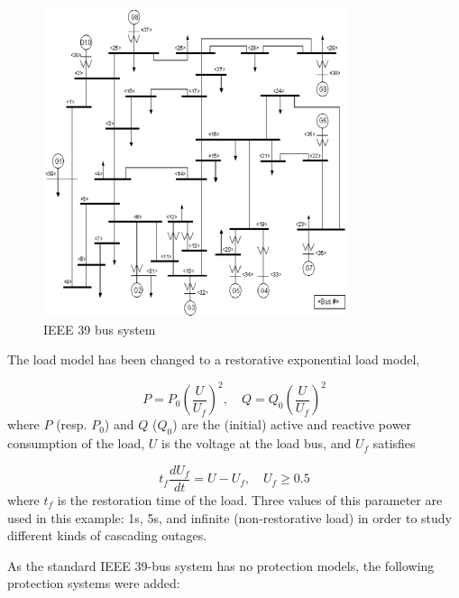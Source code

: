 \begin{figure}
    \centering
    \includegraphics[width=0.8\textwidth]{Figs/IEEE39.png}
    \caption{IEEE 39 bus system~\cite{IEEE39figure}}
    \label{fig:IEEE39}
\end{figure}

The load model has been changed to a restorative exponential load model, \ie

\begin{equation}
\label{eq:restorative_load_model_1}
P = P_0 \left(\frac{U}{U_f}\right)^2, \quad Q = Q_0 \left(\frac{U}{U_f}\right)^2
\end{equation}
\noindent where \(P\) (resp. \(P_0\)) and \(Q\) (\(Q_0\)) are the (initial) active and reactive power consumption of the load, \(U\) is the voltage at the load bus, and \(U_f\) satisfies

\begin{equation}
\label{eq:restorative_load_model_2}
t_f \frac{dU_f}{dt} = U - U_f, \quad U_f \ge 0.5
\end{equation}
\noindent where \(t_f\) is the restoration time of the load. Three values of this parameter are used in this example: 1s, 5s, and infinite (\ie non-restorative load) in order to study different kinds of cascading outages.

As the standard IEEE 39-bus system has no protection models, the following protection systems were added:

